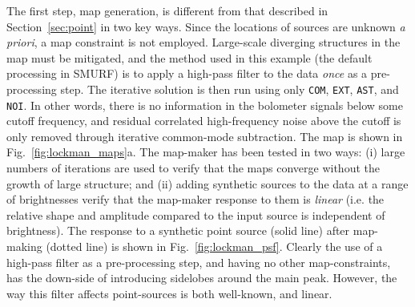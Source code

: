 \documentclass[useAMS,usenatbib,nofootinbib]{mn2e}
\newcommand{\model}[1]{\texttt{#1}}
\begin{document}
The first step, map generation, is different from that described in
Section~\ref{sec:point} in two key ways. Since the locations of
sources are unknown \emph{a priori}, a map constraint is not
employed. Large-scale diverging structures in the map must be
mitigated, and the method used in this example (the default processing
in SMURF) is to apply a high-pass filter to the data \emph{once} as a
pre-processing step. The iterative solution is then run using only
\model{COM}, \model{EXT}, \model{AST}, and \model{NOI}. In other
words, there is no information in the bolometer signals below some
cutoff frequency, and residual correlated high-frequency noise above
the cutoff is only removed through iterative common-mode
subtraction. The map is shown in Fig.~\ref{fig:lockman_maps}a. The
map-maker has been tested in two ways: (i) large numbers of iterations
are used to verify that the maps converge without the growth of large
structure; and (ii) adding synthetic sources to the data at a range of
brightnesses verify that the map-maker response to them is
\emph{linear} (i.e. the relative shape and amplitude compared to the
input source is independent of brightness). The response to a
synthetic point source (solid line) after map-making (dotted line) is
shown in Fig.~\ref{fig:lockman_psf}. Clearly the use of a high-pass
filter as a pre-processing step, and having no other map-constraints,
has the down-side of introducing sidelobes around the main
peak. However, the way this filter affects point-sources is both
well-known, and linear.
\end{document}
